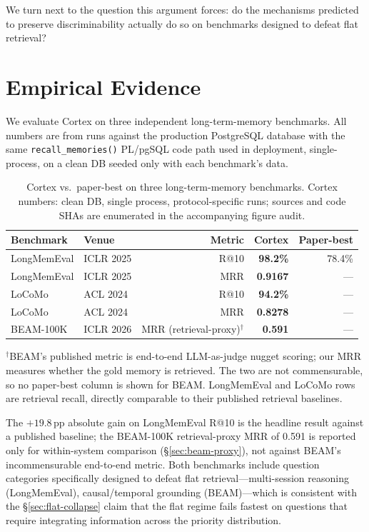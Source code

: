 \documentclass[11pt]{article}
\begin{document}
We turn next to the question this argument forces: do the
mechanisms predicted to preserve discriminability actually do so on
benchmarks designed to defeat flat retrieval?

\section{Empirical Evidence}
\label{sec:empirical}

We evaluate Cortex on three independent long-term-memory benchmarks.
All numbers are from runs against the production PostgreSQL database
with the same \texttt{recall\_memories()} PL/pgSQL code path used in
deployment, single-process, on a clean DB seeded only with each
benchmark's data.

\begin{table}[t]
\centering
\caption{Cortex vs.\ paper-best on three long-term-memory benchmarks.
Cortex numbers: clean DB, single process, protocol-specific runs;
sources and code SHAs are enumerated in the accompanying figure audit.}
\label{tab:benchmarks}
\begin{tabular}{llrrr}
\toprule
Benchmark & Venue & Metric & Cortex & Paper-best \\
\midrule
LongMemEval & ICLR 2025 & R@10    & \textbf{98.2\%} & 78.4\% \\
LongMemEval & ICLR 2025 & MRR     & \textbf{0.9167} & ---    \\
LoCoMo      & ACL 2024  & R@10    & \textbf{94.2\%} & ---    \\
LoCoMo      & ACL 2024  & MRR     & \textbf{0.8278} & ---    \\
BEAM-100K   & ICLR 2026 & MRR (retrieval-proxy)$^\dagger$ & \textbf{0.591}  & ---    \\
\bottomrule
\end{tabular}

\vspace{2pt}
{\footnotesize $^\dagger$BEAM's published metric is end-to-end
LLM-as-judge nugget scoring; our MRR measures whether the gold
memory is retrieved.  The two are not commensurable, so no
paper-best column is shown for BEAM.  LongMemEval and LoCoMo rows
are retrieval recall, directly comparable to their published
retrieval baselines.}
\end{table}

The $+19.8$\,pp absolute gain on LongMemEval R@10 is the headline
result against a published baseline; the BEAM-100K retrieval-proxy
MRR of 0.591 is reported only for within-system comparison
(\S\ref{sec:beam-proxy}), not against BEAM's incommensurable
end-to-end metric.  Both benchmarks include question categories
specifically designed to
defeat flat retrieval---multi-session reasoning (LongMemEval),
causal/temporal grounding (BEAM)---which is consistent with the
\S\ref{sec:flat-collapse} claim that the flat regime fails fastest
on questions that require integrating information across the
priority distribution.
\end{document}
